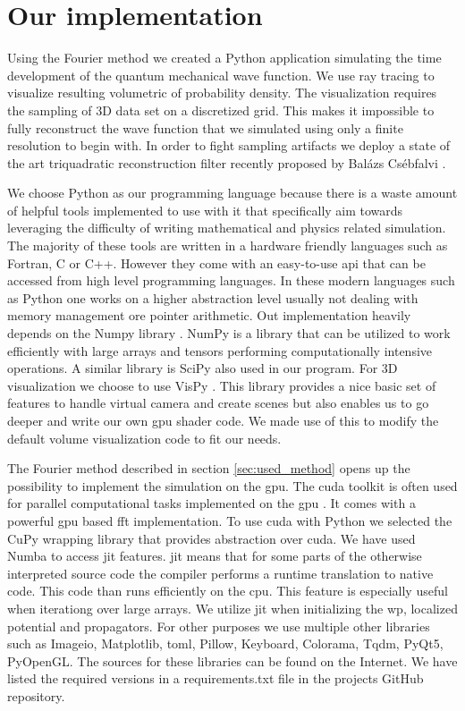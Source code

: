 \section{Our implementation}
\label{sec:our_implementation}

Using the Fourier method we created a Python application simulating the time development of the quantum mechanical wave function.
We use ray tracing to visualize resulting volumetric of probability density.
The visualization requires the sampling of 3D data set on a discretized grid.
This makes it impossible to fully reconstruct the wave function that we simulated using only a finite resolution to begin with.
In order to fight sampling artifacts we deploy a state of the art triquadratic reconstruction filter recently proposed by Balázs Csébfalvi \cite{csebfalvi2023}.

We choose Python \cite{van1995python} as our programming language because there is a waste amount of helpful tools implemented to use with it that specifically aim towards leveraging the difficulty of writing mathematical and physics related simulation.
The majority of these tools are written in a hardware friendly languages such as Fortran, C or C++.
However they come with an easy-to-use \acrfull{api} that can be accessed from high level programming languages.
In these modern languages such as Python one works on a higher abstraction level usually not dealing with memory management ore pointer arithmetic.
Out implementation heavily depends on the Numpy library \cite{harris2020array}.
NumPy is a library that can be utilized to work efficiently with large arrays and tensors performing computationally intensive operations.
A similar library is SciPy \cite{2020SciPy-NMeth} also used in our program.
For 3D visualization we choose to use VisPy \cite{vispy}.
This library provides a nice basic set of features to handle virtual camera and create scenes but also enables us to go deeper and write our own \acrshort{gpu} shader code.
We made use of this to modify the default volume visualization code to fit our needs.

The Fourier method described in section \ref{sec:used_method} opens up the possibility to implement the simulation on the \acrshort{gpu}.
The \acrfull{cuda} toolkit is often used for parallel computational tasks implemented on the \acrshort{gpu} \cite{cuda2008}.
It comes with a powerful \acrshort{gpu} based \acrshort{fft} implementation.
To use \acrshort{cuda} with Python we selected the CuPy wrapping library \cite{cupy_learningsys2017} that provides abstraction over \acrshort{cuda}.
We have used Numba to access \acrfull{jit} features.
\acrshort{jit} means that for some parts of the otherwise interpreted source code the compiler performs a runtime translation to native code.
This code than runs efficiently on the \acrshort{cpu}.
This feature is especially useful when iterationg over large arrays.
We utilize \acrshort{jit} when initializing the \acrshort{wp}, localized potential and propagators.
For other purposes we use multiple other libraries such as Imageio, Matplotlib, toml, Pillow, Keyboard, Colorama, Tqdm, PyQt5, PyOpenGL.
The sources for these libraries can be found on the Internet.
We have listed the required versions in a requirements.txt file in the projects GitHub repository.

